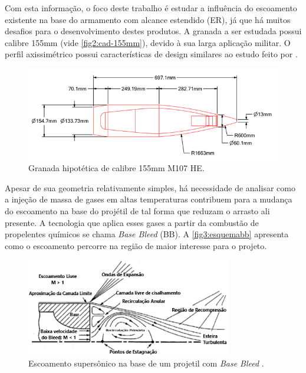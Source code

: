 Com esta informação, o foco deste trabalho é estudar a influência do escoamento existente na base do armamento com alcance estendido (ER), já que há muitos desafios para o desenvolvimento destes produtos. A granada a ser estudada possui calibre 155mm (vide \autoref{fig2:cad-155mm}), devido à sua larga aplicação militar. O perfil axissimétrico possui características de design similares ao estudo feito por \citeauthor{Mahmoud2009}.

\begin{figure}[!ht]
	\centering
	\includegraphics[width=1.0\textwidth]{foto02-cad-155mm.png}
	\caption[Granada hipotética de calibre 155mm M107 HE.]{Granada hipotética de calibre 155mm M107 HE.}
	\label{fig2:cad-155mm}
\end{figure}

Apesar de sua geometria relativamente simples, há necessidade de analisar como a injeção de massa de gases em altas temperaturas contribuem para a mudança do escoamento na base do projétil de tal forma que reduzam o arrasto ali presente. A tecnologia que aplica esses gases a partir da combustão de propelentes químicos se chama \textit{Base Bleed} (BB). A \autoref{fig3:esquemabb} apresenta como o escoamento percorre na região de maior interesse para o projeto.

\begin{figure}[!ht]
	\centering
	\includegraphics[width=0.8\textwidth]{foto03-esquema-bb.png}
	\caption[Escoamento supersônico na base de um projetil com \textit{Base Bleed}.]{Escoamento supersônico na base de um projetil com \textit{Base Bleed} \cite{Mathur&Dutton1996}.}
	\label{fig3:esquemabb}
\end{figure}

